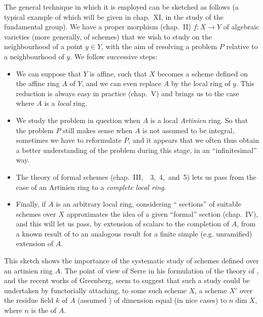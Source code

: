 The general technique in which it is employed can be sketched as follows (a
typical example of which will be given in chap.~XI, in the study of the
fundamental group). We have a proper morphism (chap.~II) $f\colon X\to Y$ of
algebraic varieties (more generally, of schemes) that we wish to study on the
neighbourhood of a point $y\in Y$, with the aim of resolving a problem $P$
relative to a neighbourhood of $y$. We follow successive steps:
\begin{itemize}
  \item[\nth{1}] We can suppose that $Y$ is affine, such that $X$ becomes a scheme
                 defined on the affine ring $A$ of $Y$, and we can even replace $A$
                 by the local ring of $y$. This reduction is always easy in practice
                 (chap.~V) and brings us to the case where $A$ is a \emph{local} ring.
  \item[\nth{2}] We study the problem in question when $A$ is a local \emph{Artinien}
                 ring. So that the problem $P$ still makes sense when $A$ is not
                 assumed to be integral, sometimes we have to reformulate $P$, and it
                 appears that we often thus obtain a better understanding of the problem
                 during this stage, in an ``infinitesimal'' way.
  \item[\nth{3}] The theory of formal schemes (chap.~III,~\textsection\textsection~3,~4,~and~5)
                 lets us pass from the case of an Artinien ring to a \emph{complete local ring}.
  \item[\nth{4}] Finally, if $A$ is an arbitrary local ring, considering
                 `` sections'' of suitable schemes over $X$
                 approximates the idea of a given ``formal'' section (chap.~IV), and
                 this will let us pass, by extension of scalars to the
                 completion of $A$, from a known result of \completelyunsure to an
                 analogous result for a finite simple (e.g. unramified) extension of $A$.
\end{itemize}

This sketch shows the importance of the systematic study of schemes defined over
an artinien ring $A$. The point of view of Serre in his formulation of the
theory of , and the recent works of Greenberg, seem
to suggest that such a study could be undertaken by functorially attaching, to
some such scheme $X$, a scheme $X'$ over the residue field $k$ of $A$ (assumed
) of dimension equal (in nice cases) to $n\dim X$, where $n$ is
the  of $A$.

